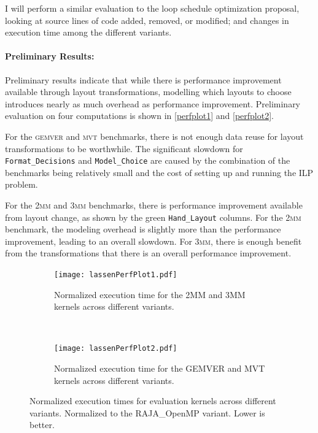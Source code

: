 \documentclass{article}
\begin{document}
I will perform a similar evaluation to the loop schedule optimization proposal, looking at source lines of code added, removed, or modified; and changes in execution time among the different variants.


\paragraph{Preliminary Results:}

Preliminary results indicate that while there is performance improvement available through layout transformations, modelling which layouts to choose introduces nearly as much overhead as performance improvement. 
Preliminary evaluation on four computations is shown in \autoref{perfplot1} and \autoref{perfplot2}. 

For the \textsc{gemver} and \textsc{mvt} benchmarks, there is not enough data reuse for layout transformations to be worthwhile. 
The significant slowdown for \verb.Format_Decisions. and \verb.Model_Choice. are caused by the combination of the benchmarks being relatively small and the cost of setting up and running the ILP problem.

For the \textsc{2mm} and \textsc{3mm} benchmarks, there is performance improvement available from layout change, as shown by the green \verb.Hand_Layout. columns. 
For the \textsc{2mm} benchmark, the modeling overhead is slightly more than the performance improvement, leading to an overall slowdown. 
For \textsc{3mm}, there is enough benefit from the transformations that there is an overall performance improvement.



\begin{figure}
\begin{subfigure}{0.45\textwidth}
\texttt{[image: lassenPerfPlot1.pdf]}
\caption{Normalized execution time for the 2MM and 3MM kernels across different variants.}
\label{perfplot1}
\end{subfigure}
~~
\begin{subfigure}{0.45\textwidth}
    \texttt{[image: lassenPerfPlot2.pdf]}
    \caption{Normalized execution time for the GEMVER and MVT kernels across different variants.}
    \label{perfplot2}
    \end{subfigure}

\caption{Normalized execution times for evaluation kernels across different variants. Normalized to the RAJA\_OpenMP variant. Lower is better.}
\end{figure}
\end{document}
